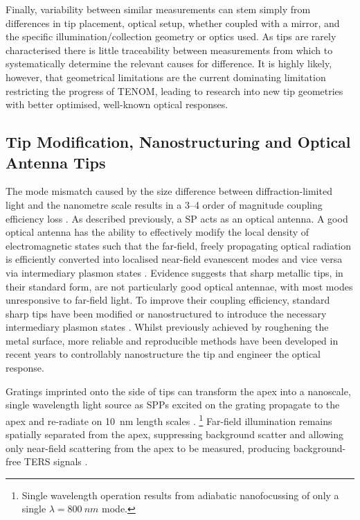 \documentclass{article}
\begin{document}
Finally, variability between similar measurements can stem simply from differences in tip placement, optical setup, whether coupled with a mirror, and the specific illumination/collection geometry or optics used. As tips are rarely characterised there is little traceability between measurements from which to systematically determine the relevant causes for difference. It is highly likely, however, that geometrical limitations are the current dominating limitation restricting the progress of TENOM, leading to research into new tip geometries with better optimised, well-known optical responses.

\subsection{Tip Modification, Nanostructuring and Optical Antenna Tips}

The mode mismatch caused by the size difference between diffraction-limited light and the nanometre scale results in a 3--4 order of magnitude coupling efficiency loss \cite{berweger2010}. As described previously, a SP acts as an optical antenna. A good optical antenna has the ability to effectively modify the local density of electromagnetic states such that the far-field, freely propagating optical radiation is efficiently converted into localised near-field evanescent modes and vice versa via intermediary plasmon states \cite{novotny2006, novotny2011}. Evidence suggests that sharp metallic tips, in their standard form, are not particularly good optical antennae, with most modes unresponsive to far-field light. To improve their coupling efficiency, standard sharp tips have been modified or nanostructured to introduce the necessary intermediary plasmon states \cite{mauser2014}. Whilst previously achieved by roughening the metal surface, more reliable and reproducible methods have been developed in recent years to controllably nanostructure the tip and engineer the optical response.

Gratings imprinted onto the side of tips can transform the apex into a nanoscale, single wavelength light source as SPPs excited on the grating propagate to the apex and re-radiate on \SI{10}{nm} length scales \cite{ropers2007, neacsu2010}.%
\footnote{Single wavelength operation results from adiabatic nanofocussing of only a single $\lambda=\SI{800}{nm}$ mode.}
Far-field illumination remains spatially separated from the apex, suppressing background scatter and allowing only near-field scattering from the apex to be measured, producing background-free TERS signals \cite{berweger2010, berweger2012}.
\end{document}
